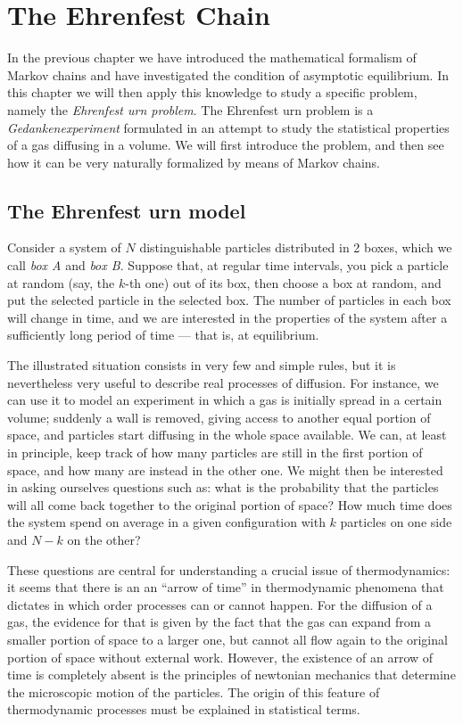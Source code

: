 \chapter{The Ehrenfest Chain} \label{ch:3}
In the previous chapter we have introduced the mathematical formalism of Markov chains and have investigated the condition of asymptotic equilibrium. In this chapter we will then apply this knowledge to study a specific problem, namely the \emph{Ehrenfest urn problem}. The Ehrenfest urn problem is a \emph{Gedankenexperiment} formulated in an attempt to study the statistical properties of a gas diffusing in a volume. We will first introduce the problem, and then see how it can be very naturally formalized by means of Markov chains.

\section{The Ehrenfest urn model}
Consider a system of $N$ distinguishable particles distributed in 2 boxes, which we call \emph{box A} and \emph{box B}. Suppose that, at regular time intervals, you pick a particle at random (say, the $k$-th one) out of its box, then choose a box at random, and put the selected particle in the selected box. The number of particles in each box will change in time, and we are interested in the properties of the system after a sufficiently long period of time --- that is, at equilibrium.

The illustrated situation consists in very few and simple rules, but it is nevertheless very useful to describe real processes of diffusion. For instance, we can use it to model an experiment in which a gas is initially spread in a certain volume; suddenly a wall is removed, giving access to another equal portion of space, and particles start diffusing in the whole space available. We can, at least in principle, keep track of how many particles are still in the first portion of space, and how many are instead in the other one. We might then be interested in asking ourselves questions such as: what is the probability that the particles will all come back together to the original portion of space? How much time does the system spend on average in a given configuration with $k$ particles on one side and $N - k$ on the other? 

These questions are central for understanding a crucial issue of thermodynamics: it seems that there is an an \enquote{arrow of time} in thermodynamic phenomena that dictates in which order processes can or cannot happen. For the diffusion of a gas, the evidence for that is given by the fact that the gas can expand from a smaller portion of space to a larger one, but cannot all flow again to the original portion of space without external work. However, the existence of an arrow of time is completely absent is the principles of newtonian mechanics that determine the microscopic motion of the particles. The origin of this feature of thermodynamic processes must be explained in statistical terms.

